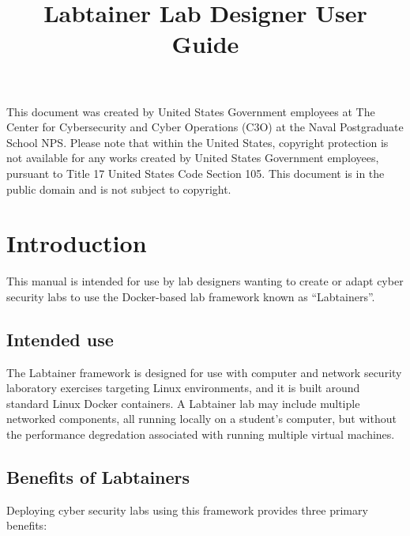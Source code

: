 \documentclass[12pt]{article}
\begin{document}
\begin{titlepage}
\title {Labtainer Lab Designer User Guide}
\maketitle

\vspace{2.0in}
This document was created by United States Government employees at 
The Center for Cybersecurity and Cyber Operations (C3O) at the Naval Postgraduate School NPS. 
Please note that within the United States, copyright protection is not available for any works created  
by United States Government employees, pursuant to Title 17 United States Code Section 105.   
This document is in the public domain and is not subject to copyright. 
\end{titlepage}
\tableofcontents
\newpage
\section {Introduction}
This manual is intended for use by lab designers wanting
to create or adapt cyber security labs to use the Docker-based lab framework known
as ``Labtainers''.

\subsection{Intended use}
The Labtainer framework is designed for use with computer and network security
laboratory exercises targeting Linux environments, and it is built around 
standard Linux Docker containers.  A Labtainer lab may include multiple 
networked components, all running locally on a student's computer, but without
the performance degredation associated with running multiple virtual machines.
\subsection {Benefits of Labtainers}

Deploying cyber security labs using this framework
provides three primary benefits:
\end{document}
